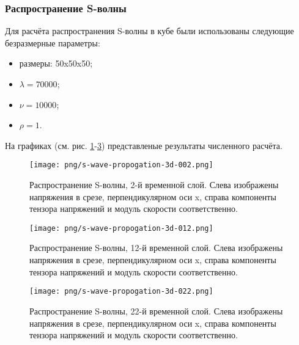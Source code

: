 \subsubsection{Распространение S-волны}
Для расчёта распространения S-волны в кубе были использованы следующие
безразмерные параметры: 
\begin{itemize}
\item размеры: 50x50x50;
\item $\lambda=70000$;
\item $\nu=10000$;
\item $\rho=1$.
\end{itemize}
На графиках (см. рис.
\ref{pic:s_wave_2}-\ref{pic:s_wave_22}) представленые результаты численного расчёта.
\begin{figure}[htp]
\centering
\texttt{[image: png/s-wave-propogation-3d-002.png]}
\caption{Распространение S-волны, 2-й временной слой. Слева изображены
напряжения в срезе, перпендикулярном оси x, справа компоненты тензора напряжений
и модуль скорости соответственно.}
\label{pic:s_wave_2}
\end{figure}
\begin{figure}[htp]
\centering
\texttt{[image: png/s-wave-propogation-3d-012.png]}
\caption{Распространение S-волны, 12-й временной слой. Слева изображены
напряжения в срезе, перпендикулярном оси x, справа компоненты тензора напряжений
и модуль скорости соответственно.}
\label{pic:s_wave_12}
\end{figure}
\begin{figure}[htp]
\centering
\texttt{[image: png/s-wave-propogation-3d-022.png]}
\caption{Распространение S-волны, 22-й временной слой. Слева изображены
напряжения в срезе, перпендикулярном оси x, справа компоненты тензора напряжений
и модуль скорости соответственно.}
\label{pic:s_wave_22}
\end{figure}
